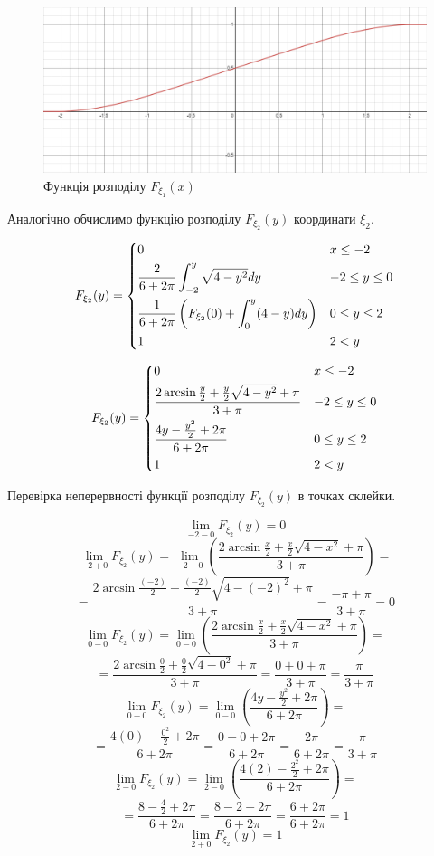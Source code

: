 \documentclass[14pt, a4paper, ukrainian]{extreport}
\begin{document}
	\begin{figure}[H]
		\centering
		\includegraphics[width=\textwidth]{./Image/Im_08_F1.png}
		\caption{Функція розподілу $F_{\xi_1}(x)$}
		\label{im:F1}
	\end{figure}
	
	Аналогічно обчислимо функцію розподілу $F_{\xi_2}(y)$ координати $\xi_2$.
	
	$$ F_{\xi_2}(y) = 
	\begin{dcases}
			0 & x \le -2\\
			\dfrac{2}{6+2\pi}\int_{-2}^{y}\sqrt{4-y^2}dy & -2 \le y \le 0\\
			\dfrac{1}{6+2\pi}\left(F_{\xi_2}(0) +  \int_{0}^{y}(4-y)dy \right)& 0 \le y \le 2\\
			1 & 2 < y\\
	\end{dcases}
	$$
	
	$$ F_{\xi_2}(y) = 
	\begin{dcases}
		0 & x \le -2\\
		\dfrac{2\arcsin{\frac{y}{2}} + \frac{y}{2}\sqrt{4-y^2} + \pi}{3+\pi} & -2 \le y \le 0\\
		\dfrac{4y - \frac{y^2}{2} + 2\pi}{6+2\pi}& 0 \le y \le 2\\
		1 & 2 < y\\
	\end{dcases}
	$$
	
		Перевірка неперервності функції розподілу $F_{\xi_2}(y)$ в точках склейки.
		
		$$\lim\limits_{-2-0}F_{\xi_2}(y) = 0
		$$
		$$\lim\limits_{-2+0}F_{\xi_2}(y) = \lim\limits_{-2+0}\left(\dfrac{2\arcsin{\frac{x}{2}} + \frac{x}{2}\sqrt{4-x^2} + \pi}{3+\pi}\right) =
		$$
		$$ = \dfrac{2\arcsin{\frac{(-2)}{2}} + \frac{(-2)}{2}\sqrt{4-(-2)^2} + \pi}{3+\pi} = \dfrac{-\pi + \pi}{3+\pi} = 0
		$$
		$$\lim\limits_{0-0}F_{\xi_2}(y) = \lim\limits_{0-0}\left(\dfrac{2\arcsin{\frac{x}{2}} + \frac{x}{2}\sqrt{4-x^2} + \pi}{3+\pi}\right) = 
		$$
		$$ = \dfrac{2\arcsin{\frac{0}{2}} + \frac{0}{2}\sqrt{4-0^2} + \pi}{3+\pi} = \dfrac{0 +0 +\pi}{3+\pi} = \dfrac{\pi}{3+\pi}
		$$
		$$\lim\limits_{0+0}F_{\xi_2}(y) = \lim\limits_{0-0}\left(\dfrac{4y - \frac{y^2}{2} + 2\pi}{6+2\pi}\right) =
		$$
		$$ = \dfrac{4(0) - \frac{0^2}{2} + 2\pi}{6+2\pi} = \dfrac{0 - 0 + 2\pi}{6+2\pi} = \dfrac{2\pi}{6+2\pi} = \dfrac{\pi}{3+\pi}
		$$
		$$ \lim\limits_{2-0}F_{\xi_2}(y) = \lim\limits_{2-0}\left(\dfrac{4(2) - \frac{2^2}{2} + 2\pi}{6+2\pi}\right) =
		$$
		$$ = \dfrac{8 - \frac{4}{2} + 2\pi}{6+2\pi} = \dfrac{8 - 2 + 2\pi}{6+2\pi} = \dfrac{6 + 2\pi}{6+2\pi} = 1
		$$
		$$ \lim\limits_{2+0}F_{\xi_2}(y) = 1
		$$
		
\end{document}

